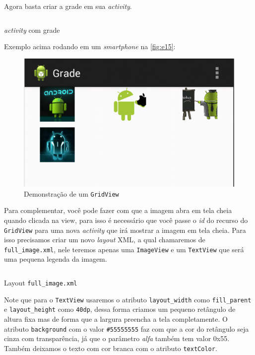 \documentclass[a4paper,12pt,brazil,oneside]{book}
\begin{document}
Agora basta criar a grade em sua \emph{activity}.

\begin{listing}[H]
\inputminted[linenos=true,fontsize=\small,frame=lines, framesep=2mm, tabsize=2,numbersep=5pt]{java}{src/design/grade-activity.java}
\caption{\emph{activity} com grade}
\end{listing}	

Exemplo acima rodando em um \emph{smartphone} na \autoref{fig:e15}:

\begin{figure}[H]
  \centering
  \includegraphics[width=.475\textwidth]{figuras/design/grade-exemplo1.png}
  \caption{Demonstração de um \texttt{GridView}}
  \label{fig:e15}
\end{figure}

Para complementar, você pode fazer com que a imagem abra em tela cheia quando clicada na view, para isso é necessário que você passe o \emph{id} do recurso do \texttt{GridView} para uma nova \emph{activity} que irá mostrar a imagem em tela cheia.
Para isso precisamos criar um novo \emph{layout} XML, a qual chamaremos de \texttt{full\_image.xml}, nele teremos apenas uma \texttt{ImageView} e um \texttt{TextView} que será uma pequena legenda da imagem.

\begin{listing}[H]
\inputminted[linenos=true,fontsize=\small,frame=lines, framesep=2mm, tabsize=2,numbersep=5pt]{xml}{src/design/full-image.xml}
\caption{Layout \texttt{full\_image.xml}}
\end{listing}	

Note que para o \texttt{TextView} usaremos o atributo \texttt{layout\_width} como \texttt{fill\_parent} e \texttt{layout\_height} como \texttt{40dp}, dessa forma criamos um pequeno retângulo de altura fixa mas de forma que a largura preencha a tela completamente. O atributo \texttt{background} com o valor \texttt{\#55555555} faz com que a cor do retângulo seja cinza com transparência, já que o parâmetro \emph{alfa} também tem valor 0x55. Também deixamos o texto com cor branca com o atributo \texttt{textColor}.
\end{document}

